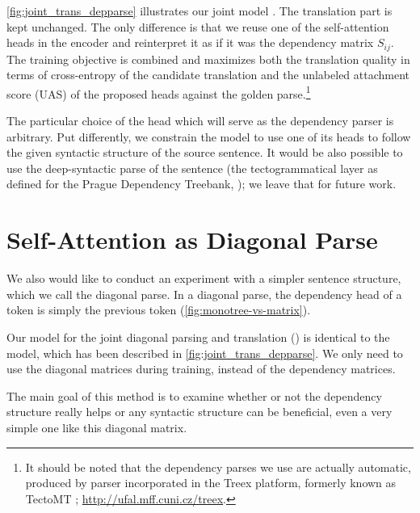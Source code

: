 \cref{fig:joint_trans_depparse} illustrates our joint model \DepParse. The translation
part is kept unchanged. The only difference is that we reuse one of the
self-attention heads in the \transformer encoder and reinterpret it as if it was
the dependency matrix $S_{ij}$.
The training objective is combined and
maximizes both the translation quality in terms of cross-entropy of the
candidate translation and the unlabeled attachment score (UAS) of the proposed
heads against the golden parse.\footnote{It should be noted that the dependency
parses we use are actually automatic, produced by
 parser incorporated in the Treex
platform, formerly known as TectoMT ;
\url{http://ufal.mff.cuni.cz/treex}.}

The particular choice of the head which will serve as the dependency parser is
arbitrary. Put differently, we constrain the \transformer model to use one of its
heads to follow the given syntactic structure of the source sentence. It would be also
possible to use the deep-syntactic parse of the sentence (the
tectogrammatical layer as defined for the Prague Dependency Treebank,
); we leave that for future work.

\section{Self-Attention as Diagonal Parse}
\label{multitask-diagonal}

We also would like to conduct an experiment with a simpler sentence structure, which we call the diagonal parse. In a diagonal parse, the dependency head of a token is simply the previous token (\cref{fig:monotree-vs-matrix}).

Our model for the joint diagonal parsing and translation (\DiagonalParse) is identical to the \DepParse model, which has been described in \cref{fig:joint_trans_depparse}. We only need to use the diagonal matrices during training, instead of the dependency matrices.

The main goal of this method is to examine whether or not the dependency structure really helps or any syntactic structure can be beneficial, even a very simple one like this diagonal matrix. 

